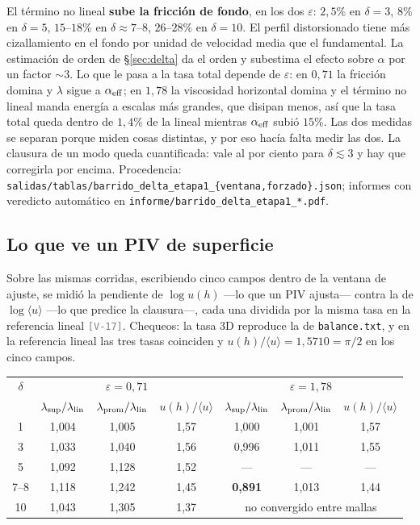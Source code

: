 \documentclass[11pt,a4paper]{article}
\newcommand{\avg}[1]{\langle #1\rangle}
\newcommand{\etq}[1]{\textcolor{gray}{\texttt{[#1]}}}
\begin{document}
El término no lineal \textbf{sube la fricción de fondo}, en los dos $\varepsilon$:
$2{,}5\%$ en $\delta=3$, $8\%$ en $\delta=5$, $15$--$18\%$ en $\delta\approx7$--$8$,
$26$--$28\%$ en $\delta=10$. El perfil distorsionado tiene más cizallamiento en el fondo
por unidad de velocidad media que el fundamental. La estimación de orden de
§\ref{sec:delta} da el orden y subestima el efecto sobre $\alpha$ por un factor $\sim3$.
Lo que le pasa a la tasa total depende de $\varepsilon$: en $0{,}71$ la fricción domina y
$\lambda$ sigue a $\alpha_{\rm eff}$; en $1{,}78$ la viscosidad horizontal domina y el
término no lineal manda energía a escalas más grandes, que disipan menos, así que la
tasa total queda dentro de $1{,}4\%$ de la lineal mientras $\alpha_{\rm eff}$ subió
$15\%$. Las dos medidas se separan porque miden cosas distintas, y por eso hacía falta
medir las dos. La clausura de un modo queda cuantificada: vale al por ciento para
$\delta\lesssim3$ y hay que corregirla por encima. Procedencia:
\texttt{salidas/tablas/barrido\_delta\_etapa1\_\{ventana,forzado\}.json}; informes con
veredicto automático en \texttt{informe/barrido\_delta\_etapa1\_*.pdf}.

\subsection{Lo que ve un PIV de superficie}
\label{sec:v17}

Sobre las mismas corridas, escribiendo cinco campos dentro de la ventana de ajuste, se
midió la pendiente de $\log u(h)$ ---lo que un PIV ajusta--- contra la de
$\log\avg{u}$ ---lo que predice la clausura---, cada una dividida por la misma tasa en la
referencia lineal \etq{V-17}. Chequeos: la tasa 3D reproduce la de \texttt{balance.txt},
y en la referencia lineal las tres tasas coinciden y $u(h)/\avg u=1{,}5710=\pi/2$ en
los cinco campos.

\begin{center}
\small
\begin{tabular}{ccccccc}
\toprule
$\delta$ & \multicolumn{3}{c}{$\varepsilon=0{,}71$} & \multicolumn{3}{c}{$\varepsilon=1{,}78$}\\
 & $\lambda_{\rm sup}/\lambda_{\rm lin}$ & $\lambda_{\rm prom}/\lambda_{\rm lin}$ & $u(h)/\avg u$
 & $\lambda_{\rm sup}/\lambda_{\rm lin}$ & $\lambda_{\rm prom}/\lambda_{\rm lin}$ & $u(h)/\avg u$\\
\midrule
1 & 1,004 & 1,005 & 1,57 & 1,000 & 1,001 & 1,57\\
3 & 1,033 & 1,040 & 1,56 & 0,996 & 1,011 & 1,55\\
5 & 1,092 & 1,128 & 1,52 & --- & --- & ---\\
7--8 & 1,118 & 1,242 & 1,45 & \textbf{0,891} & 1,013 & 1,44\\
10 & 1,043 & 1,305 & 1,37 & \multicolumn{3}{c}{no convergido entre mallas}\\
\bottomrule
\end{tabular}
\end{center}
\end{document}
